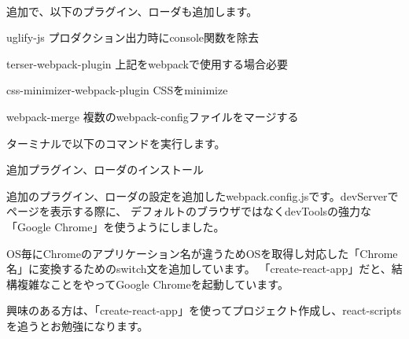 {}\\[0pt]
追加で、以下のプラグイン、ローダも追加します。

\begin{starteritemize}
\item uglify{-}js プロダクション出力時にconsole関数を除去
\item terser{-}webpack{-}plugin 上記をwebpackで使用する場合必要
\item css{-}minimizer{-}webpack{-}plugin CSSをminimize
\item webpack{-}merge 複数のwebpack{-}configファイルをマージする
\end{starteritemize}

ターミナルで以下のコマンドを実行します。

\def\startercodeblockfontsize{}
\begin{starterterminal}[]{追加プラグイン、ローダのインストール}\end{starterterminal}

追加のプラグイン、ローダの設定を追加したwebpack.config.jsです。devServerでページを表示する際に、
デフォルトのブラウザではなくdevToolsの強力な「Google Chrome」を使うようにしました。

\vspace*{\baselineskip}

OS毎にChromeのアプリケーション名が違うためOSを取得し対応した「Chrome名」に変換するためのswitch文を追加しています。
「create{-}react{-}app」だと、結構複雑なことをやってGoogle Chromeを起動しています。

\vspace*{\baselineskip}

興味のある方は、「create{-}react{-}app」を使ってプロジェクト作成し、react{-}scriptsを追うとお勉強になります。

